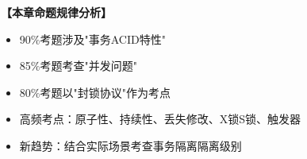 \documentclass[12pt, a4paper]{article}
\newenvironment{bluebox}[1]{%
  \begin{trivlist}
  \item[\hskip\labelsep \textbf{#1}]
  \setlength{\parskip}{0.5ex}
  \setlength{\itemsep}{0.5ex}
}{%
  \end{trivlist}
  }
\begin{document}
\begin{bluebox}{近年真题规律}
	\textbf{【本章命题规律分析】}

	\begin{itemize}
		\item 90\%考题涉及"事务ACID特性"
		\item 85\%考题考查"并发问题"
		\item 80\%考题以"封锁协议"作为考点
		\item 高频考点：原子性、持续性、丢失修改、X锁S锁、触发器
		\item 新趋势：结合实际场景考查事务隔离隔离级别
	\end{itemize}
\end{bluebox}
\end{document}
